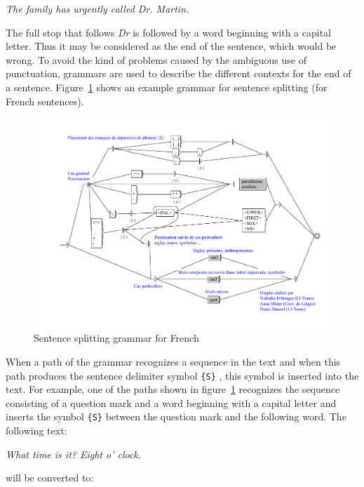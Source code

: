 \bigskip
\textit{The family has urgently called Dr. Martin.}

\bigskip \noindent The full stop that follows \textit{Dr} is followed by a word
beginning with a capital letter. Thus it may be considered as the end of the
sentence, which would be wrong. To avoid the kind of problems caused by the
ambiguous use of punctuation, grammars are used to  describe the different
contexts for the end of a sentence.
Figure~\ref{fig-example-sentence-splitting} shows an example grammar for
sentence splitting (for French sentences).

\begin{figure}[!ht]
\begin{center}
\includegraphics[width=15cm]{resources/img/fig2-10.pdf}
\caption{Sentence splitting grammar for
French\label{fig-example-sentence-splitting}}
\end{center}
\end{figure}

\bigskip
\noindent When a path of the grammar recognizes a sequence in the text and when
this path produces the sentence delimiter symbol \verb+{S}+
, this symbol is inserted into the
text. For example, one of the paths shown in
figure~\ref{fig-example-sentence-splitting} recognizes the sequence consisting
of a question mark and a word beginning with a capital letter and inserts the 
symbol \verb+{S}+ between the question mark and
the following word. The following text:

\bigskip
\textit{What time is it? Eight o' clock.}

\bigskip
\noindent will be converted to:

